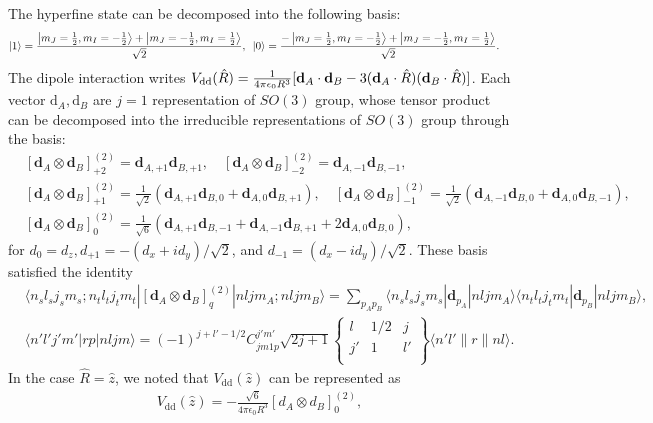 The hyperfine state can be decomposed into the following basis:
\begin{align}
    \ket1
    &=\frac{
    \ket{m_J=\tfrac12,m_I=-\tfrac12}
    +\ket{m_J=-\tfrac12,m_I=\tfrac12}
    }{\sqrt2}
    ,\,\,\, \ket0
    =\frac{-\ket{m_J=\tfrac12,m_I=-\tfrac12}
    +\ket{m_J=-\tfrac12,m_I=\tfrac12}}{\sqrt2}.
\end{align}
The dipole interaction writes $V_{\rm dd}(\hat{R})=\frac{1}{4\pi\epsilon_0 R^{3}}[\mathbf{d}_A\cdot \mathbf{d}_B - 3(\mathbf{d}_A\cdot \hat{R})(\mathbf{d}_B\cdot \hat{R})]$.
Each vector $\mathrm{d}_A,\mathrm{d}_B$ are $j = 1$ representation of $SO(3)$ group, whose tensor product can be decomposed into the irreducible representations of $SO(3)$ group through the basis:
\begin{align}
    &[\mathbf{d}_{A}\otimes \mathbf{d}_B]_{+2}^{(2)}=\mathbf{d}_{A,+1}\mathbf{d}_{B,+1},\quad [\mathbf{d}_{A}\otimes \mathbf{d}_B]_{-2}^{(2)}=\mathbf{d}_{A,-1}\mathbf{d}_{B,-1},\\
    &[\mathbf{d}_{A}\otimes \mathbf{d}_B]_{+1}^{(2)}=\frac{1}{\sqrt{2}}(\mathbf{d}_{A,+1}\mathbf{d}_{B,0}+\mathbf{d}_{A,0}\mathbf{d}_{B,+1}),\quad [\mathbf{d}_{A}\otimes \mathbf{d}_B]_{-1}^{(2)}=\frac{1}{\sqrt{2}}(\mathbf{d}_{A,-1}\mathbf{d}_{B,0}+\mathbf{d}_{A,0}\mathbf{d}_{B,-1}),\\
    &[\mathbf{d}_{A}\otimes \mathbf{d}_B]_{0}^{(2)}=\frac{1}{\sqrt{6}}(\mathbf{d}_{A,+1}\mathbf{d}_{B,-1}+\mathbf{d}_{A,-1}\mathbf{d}_{B,+1}+2\mathbf{d}_{A,0}\mathbf{d}_{B,0}),
\end{align}
for $d_0=d_z, d_{+1} = -(d_x + i d_y)/\sqrt{2}$, and $d_{-1} = (d_x - i d_y)/\sqrt{2}$.
These basis satisfied the identity
\begin{align}
&\langle n_s l_s j_s m_s ; n_tl_t j_t m_t|[\mathbf{d}_A\otimes\mathbf{d}_B]_q^{(2)}|n ljm_A;n ljm_B\rangle=\sum_{p_A p_B}\langle n_s l_s j_s m_s|\mathbf{d}_{p_A}|n l j m_A\rangle\langle n_t l_t j_t m_t|\mathbf{d}_{p_B}|n l j m_B\rangle,\\
& 
\langle n'l'j'm'|rp|nljm \rangle=(-1)^{j+l'-1/2}C_{jm1p}^{j'm'}\sqrt{2j+1}\left\{\begin{matrix}
l & {1}/{2}   & j \\
j' & 1    & l' \\
\end{matrix}
\right\} \langle n'l' \| r \| nl\rangle.
\end{align}
In the case $\hat{R} = \hat{z}$, we noted that $V_{\mathrm{dd}}(\hat{z})$ can be represented as
\begin{align}
   V_{\mathrm{dd}}(\hat{z}) = -\frac{\sqrt{6}}{4 \pi \epsilon_0 R^3} [d_A \otimes d_B]_{0}^{(2)},
\end{align}
